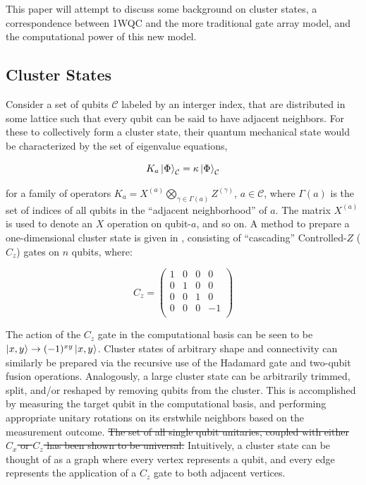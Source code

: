 \documentclass[twocolumn]{IEEEtran11}
\newcommand{\clb}{\color{blue}}
\newcommand{\clr}{\color{myRed}}
\newcommand{\clbl}{\color{black}}
\begin{document}
This paper will attempt to discuss some background on cluster states, a correspondence between 1WQC and the more traditional gate array model, and the computational power of this new model.

\subsection{Cluster States}
\clb Consider a set of qubits $\mathcal{C}$ labeled by an interger index, that are distributed in some lattice such that every qubit can be said to have adjacent neighbors. For these to collectively form a cluster state, their quantum mechanical state would be characterized by the set of eigenvalue equations\cite{briegel2001persistent},

\begin{equation}
  K_a\left|\mspace{0.5mu} \Phi \mspace{0.5mu}\right\rangle_{\mathcal{C}}= \kappa\left|\mspace{0.5mu} \Phi \mspace{0.5mu}\right\rangle_{\mathcal{C}}
\end{equation}

for a family of operators $K_a = X^{(a)}\bigotimes_{\gamma\in\Gamma(a)}Z^{(\gamma)}$, $a\in\mathcal{C}$, where $\Gamma(a)$ is the set of indices of all qubits in the ``adjacent neighborhood'' of $a$. The matrix $X^{(a)}$ is used to denote an $X$ operation on qubit-$a$, and so on. \clbl A method to prepare a one-dimensional cluster state is given in \cite{jorrand2005unifying}, consisting of ``cascading'' Controlled-$Z$ ($C_z$) gates on $n$ qubits, where:

\[
C_z = 
\begin{pmatrix}
  1 & 0 & 0 & 0 \\
  0 & 1 & 0 & 0 \\
  0 & 0 & 1 & 0 \\
  0 & 0 & 0 & -1 \\
 \end{pmatrix}
\]

The action of the $C_z$ gate in the computational basis can be seen to be $\left|\mspace{0.5mu} x,y \mspace{0.5mu}\right\rangle \to (-1)^{xy}\left|\mspace{0.5mu} x,y \mspace{0.5mu}\right\rangle$. \clb Cluster states of arbitrary shape and connectivity can similarly be prepared via the recursive use of the Hadamard gate and two-qubit fusion operations\cite{browne2005efficient,gerald2006efficient}. Analogously, a large cluster state can be arbitrarily trimmed, split, and/or reshaped by removing qubits from the cluster. This is accomplished by measuring the target qubit in the computational basis, and performing appropriate unitary rotations on its erstwhile neighbors based on the measurement outcome. \clr \sout{The set of all single qubit unitaries, coupled with either $C_x$ or $C_z$ has been shown to be universal\cite{brylinski2002universal}.} \clbl Intuitively, a cluster state can be thought of as a graph where every vertex represents a qubit, and every edge represents the application of a $C_z$ gate to both adjacent vertices.
\end{document}
